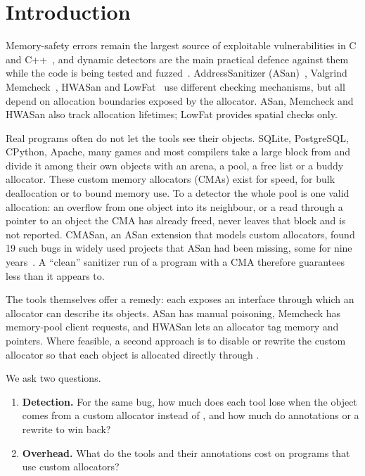 \section{Introduction}
\label{sec:intro}

Memory-safety errors remain the largest source of exploitable vulnerabilities in C and C++~\cite{szekeres2013sok}, and dynamic detectors are the main practical defence against them while the code is being tested and fuzzed~\cite{song2019sok}. AddressSanitizer (ASan)~\cite{serebryany2012asan}, Valgrind Memcheck~\cite{nethercote2007valgrind}, HWASan and LowFat~\cite{duck2016lowfat} use different checking mechanisms, but all depend on allocation boundaries exposed by the allocator. ASan, Memcheck and HWASan also track allocation lifetimes; LowFat provides spatial checks only.

Real programs often do not let the tools see their objects. SQLite, PostgreSQL, CPython, Apache, many games and most compilers take a large block from  and divide it among their own objects with an arena, a pool, a free list or a buddy allocator. These custom memory allocators (CMAs) exist for speed, for bulk deallocation or to bound memory use. To a detector the whole pool is one valid allocation: an overflow from one object into its neighbour, or a read through a pointer to an object the CMA has already freed, never leaves that block and is not reported. CMASan, an ASan extension that models custom allocators, found 19 such bugs in widely used projects that ASan had been missing, some for nine years~\cite{hong2025cmasan}. A ``clean'' sanitizer run of a program with a CMA therefore guarantees less than it appears to.

The tools themselves offer a remedy: each exposes an interface through which an allocator can describe its objects. ASan has manual poisoning, Memcheck has memory-pool client requests, and HWASan lets an allocator tag memory and pointers. Where feasible, a second approach is to disable or rewrite the custom allocator so that each object is allocated directly through .
\begin{samepage}
We ask two questions.

\begin{enumerate}[label=\textbf{Q\arabic*.},leftmargin=*,labelsep=0.6em]
\item \textbf{Detection.} For the same bug, how much does each tool lose when the object comes from a custom allocator instead of , and how much do annotations or a rewrite to  win back?
\item \textbf{Overhead.} What do the tools and their annotations cost on programs that use custom allocators?
\end{enumerate}
\end{samepage}


